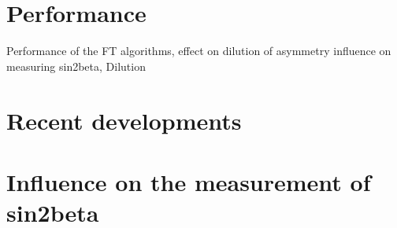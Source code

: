 \section{Performance}
\label{sec:flavour_tagging:performance}
Performance of the FT algorithms, effect on dilution of asymmetry
influence on measuring sin2beta, Dilution

\section{Recent developments}
\label{sec:flavour_tagging:developments}

\section{Influence on the measurement of sin2beta}
\label{sec:flavour_tagging:sin2beta}
